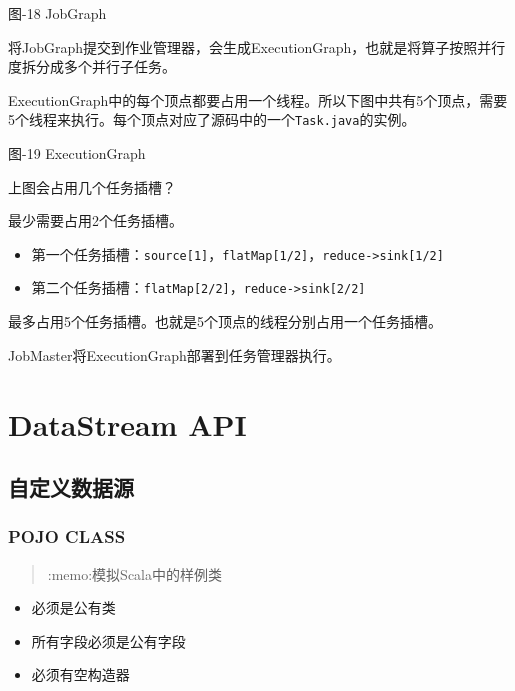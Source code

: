 图-18 JobGraph

将JobGraph提交到作业管理器，会生成ExecutionGraph，也就是将算子按照并行度拆分成多个并行子任务。

ExecutionGraph中的每个顶点都要占用一个线程。所以下图中共有5个顶点，需要5个线程来执行。每个顶点对应了源码中的一个\texttt{Task.java}的实例。

图-19 ExecutionGraph

上图会占用几个任务插槽？

最少需要占用2个任务插槽。

\begin{itemize}
\tightlist
\item
  第一个任务插槽：\texttt{source{[}1{]}}，\texttt{flatMap{[}1/2{]}}，\texttt{reduce-\textgreater{}sink{[}1/2{]}}
\item
  第二个任务插槽：\texttt{flatMap{[}2/2{]}}，\texttt{reduce-\textgreater{}sink{[}2/2{]}}
\end{itemize}

最多占用5个任务插槽。也就是5个顶点的线程分别占用一个任务插槽。

JobMaster将ExecutionGraph部署到任务管理器执行。

\hypertarget{datastream-api}{%
\section{DataStream API}\label{datastream-api}}

\hypertarget{ux81eaux5b9aux4e49ux6570ux636eux6e90}{%
\subsection{自定义数据源}\label{ux81eaux5b9aux4e49ux6570ux636eux6e90}}

\hypertarget{pojo-class}{%
\subsubsection{POJO CLASS}\label{pojo-class}}

\begin{quote}
:memo:模拟Scala中的样例类
\end{quote}

\begin{itemize}
\tightlist
\item
  必须是公有类
\item
  所有字段必须是公有字段
\item
  必须有空构造器
\end{itemize}

